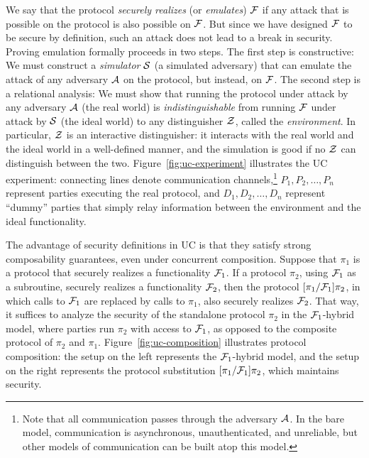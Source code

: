 We say that the protocol \emph{securely realizes} (or \emph{emulates}) $\mathcal{{F}}$
if any attack that is possible on the protocol is also possible on $\mathcal{{F}}$. But
since we have designed $\mathcal{{F}}$ to be secure by definition, such an attack does
not lead to a break in security. Proving emulation formally proceeds in two
steps. The first step is constructive: We must construct a \emph{simulator}
$\mathcal{{S}}$ (a simulated adversary) that can emulate the attack of any adversary
$\mathcal{{A}}$ on the protocol, but instead, on $\mathcal{{F}}$. The second step is a
relational analysis: We must show that running the protocol under attack by any
adversary $\mathcal{{A}}$ (the real world) is \emph{indistinguishable} from running
$\mathcal{{F}}$ under attack by $\mathcal{{S}}$ (the ideal world) to any distinguisher
$\mathcal{{Z}}$, called the \emph{environment}. In particular, $\mathcal{{Z}}$ is an
interactive distinguisher: it interacts with the real world and the ideal world
in a well-defined manner, and the simulation is good if no $\mathcal{{Z}}$ can
distinguish between the two. Figure~\ref{fig:uc-experiment} illustrates the UC
experiment: connecting lines denote communication channels,\footnote{Note that
  all communication passes through the adversary $\mathcal{{A}}$. In the bare model,
  communication is asynchronous, unauthenticated, and unreliable, but other
  models of communication can be built atop this model.} $P_1, P_2, \ldots, P_n$
represent parties executing the real protocol, and $D_1, D_2, \ldots, D_n$ represent
``dummy'' parties that simply relay information between the environment and the
ideal functionality.

The advantage of security definitions in UC is that they satisfy strong
composability guarantees, even under concurrent composition. Suppose that $\pi_1$
is a protocol that securely realizes a functionality $\mathcal{{F}}_1$. If a protocol
$\pi_2$, using $\mathcal{{F}}_1$ as a subroutine, securely realizes a functionality
$\mathcal{{F}}_2$, then the protocol $[\pi_1 / \mathcal{{F}}_1]\pi_2$, in which calls to
$\mathcal{{F}}_1$ are replaced by calls to $\pi_1$, also securely realizes
$\mathcal{{F}}_2$. That way, it suffices to analyze the security of the standalone
protocol $\pi_2$ in the $\mathcal{{F}}_1$-hybrid model, where parties run $\pi_2$ with
access to $\mathcal{{F}}_1$, as opposed to the composite protocol of $\pi_2$ and
$\pi_1$. Figure~\ref{fig:uc-composition} illustrates protocol composition: the
setup on the left represents the $\mathcal{{F}}_1$-hybrid model, and the setup on the
right represents the protocol substitution $[\pi_1 / \mathcal{{F}}_1]\pi_2$, which
maintains security.

